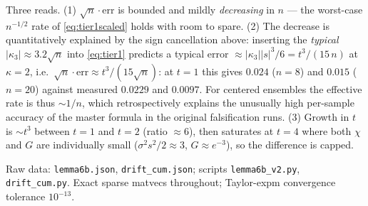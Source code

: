 \documentclass[11pt]{article}
\theoremstyle{remark}
\begin{document}
Three reads. (1) $\sqrt n\cdot$err is bounded and mildly \emph{decreasing}
in $n$ --- the worst-case $n^{-1/2}$ rate of \eqref{eq:tier1scaled} holds
with room to spare. (2) The decrease is quantitatively explained by the
sign cancellation above: inserting the \emph{typical}
$|\kappa_3|\approx3.2\sqrt n$ into \eqref{eq:tier1} predicts a typical
error $\approx|\kappa_3||s|^3/6= t^3/(15\,n)$ at $\kappa=2$, i.e.\
$\sqrt n\cdot\mathrm{err}\approx t^3/(15\sqrt n)$: at $t=1$ this gives
$0.024$ ($n=8$) and $0.015$ ($n=20$) against measured $0.0229$ and
$0.0097$. For centered ensembles the effective rate is thus $\sim1/n$, which
retrospectively explains the unusually high per-sample accuracy of the
master formula in the original falsification runs. (3) Growth in $t$ is
$\sim t^3$ between $t=1$ and $t=2$ (ratio $\approx6$), then saturates at
$t=4$ where both $\chi$ and $G$ are individually small
($\sigma^2s^2/2\approx3$, $G\approx e^{-3}$), so the difference is capped.

\medskip
\noindent Raw data: \texttt{lemma6b.json}, \texttt{drift\_cum.json};
scripts \texttt{lemma6b\_v2.py}, \texttt{drift\_cum.py}. Exact sparse
matvecs throughout; Taylor-expm convergence tolerance $10^{-13}$.
\end{document}
